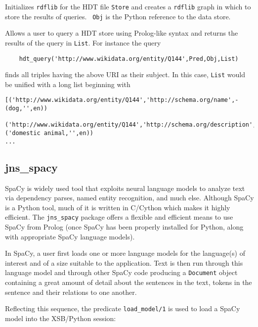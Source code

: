 \begin{description}
  Initializes {\tt rdflib} for the HDT file {\tt Store} and creates a
  {\tt rdflib} graph in which to store the results of queries.  {\tt
    Obj} is the Python reference to the data store.
  

  Allows a user to query a HDT store using Prolog-like syntax and
  returns the results of the query in {\tt List}.  For instance the query
\begin{verbatim}
    hdt_query('http://www.wikidata.org/entity/Q144',Pred,Obj,List)
\end{verbatim}
finds all triples having the above URI as their subject.  In this
case, {\tt List} would be unified with a long list beginning with
\begin{footnotesize}
\begin{verbatim}
[('http://www.wikidata.org/entity/Q144','http://schema.org/name',-(dog,'',en))
 ('http://www.wikidata.org/entity/Q144','http://schema.org/description',-('domestic animal,'',en))
...
\end{verbatim}
\end{footnotesize}
\end{description}

\subsection{jns\_spacy}
SpaCy is widely used tool that exploits neural language models to
analyze text via dependency parses, named entity recognition, and much
else.  Although SpaCy is a Python tool, much of it is written in
C/Cython which makes it highly efficient.  The {\tt jns\_spacy} package
offers a flexible and efficient means to use SpaCy from Prolog (once
SpaCy has been properly installed for Python, along with appropriate
SpaCy language models).

In SpaCy, a user first loads one or more language models for the
language(s) of interest and of a size suitable to the application.
Text is then run through this language model and through other SpaCy
code producing a {\tt Document} object containing a great amount of
detail about the sentences in the text, tokens in the sentence and
their relations to one another.

Reflecting this sequence, the predicate {\tt load\_model/1} is used to
load a SpaCy model into the XSB/Python session:

